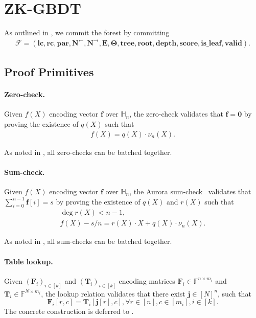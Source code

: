 \section{ZK-GBDT}\label{sec:zkgbdt-protocol}

As outlined in ,
    we commit the forest by committing
    \begin{align}
        \mathcal{F} = (\mathbf{lc}, \mathbf{rc}, \mathbf{par}, \mathbf{N}^{\leftarrow}, \mathbf{N}^{\rightarrow}, \mathbf{E}, \boldsymbol{\Theta}, \mathbf{tree}, \mathbf{root}, \mathbf{depth}, \mathbf{score}, \mathbf{is\_leaf}, \mathbf{valid}).
    \end{align}

\subsection{Proof Primitives}\label{subsec:zkgbdt-primitives}
\paragraph{Zero-check.}
Given $f(X)$ encoding vector $\mathbf{f}$ over $\mathbb{H}_n$,
    the zero-check validates that $\mathbf{f} = \mathbf{0}$ by proving the existence of $q(X)$ such that
    \begin{align}
        f(X) = q(X)\cdot \nu_n(X).
    \end{align}

As noted in , all zero-checks can be batched together.
    
\paragraph{Sum-check.}
Given $f(X)$ encoding vector $\mathbf{f}$ over $\mathbb{H}_n$,
    the Aurora sum-check~\cite{aurora19} validates that $\sum_{i=0}^{n-1} \mathbf{f}[i] = s$ by proving the existence of $q(X)$
    and $r(X)$ such that
    \begin{align}
        \deg r(X) < n-1, \\
        f(X) - s/n = r(X) \cdot X + q(X)\cdot \nu_n(X).
    \end{align}
    
As noted in , all sum-checks can be batched together.

\paragraph{Table lookup.}
Given $(\mathbf{F}_i)_{i\in [k]}$ and $(\mathbf{T}_i)_{i\in [k]}$
    encoding matrices $\mathbf{F}_i\in \mathbb{F}^{n\times m_i}$
    and $\mathbf{T}_i\in \mathbb{F}^{N\times m_i}$,
    the lookup relation validates that there exist
    $\mathbf{j}\in [N]^n$, such that
    \[
        \mathbf{F}_i[r, c] = \mathbf{T}_i[\mathbf{j}[r], c], \forall r\in [n], c\in [m_i], i\in [k].
    \]
    The concrete construction
    is deferred to .


